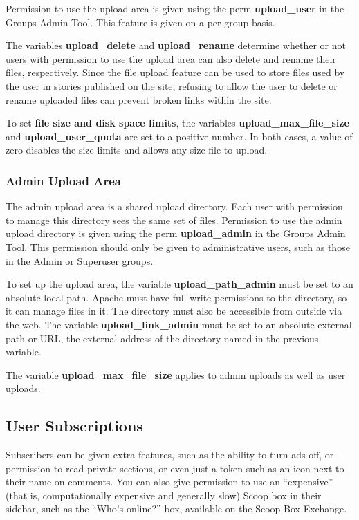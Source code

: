 Permission to use the upload area is given using the perm {\bf upload\_user} in the Groups Admin Tool. This feature is given on a per-group basis.

The variables {\bf upload\_delete} and {\bf upload\_rename} determine whether or not users with permission to use the upload area can also delete and rename their files, respectively. Since the file upload feature can be used to store files used by the user in stories published on the site, refusing to allow the user to delete or rename uploaded files can prevent broken links within the site.

To set {\bf file size and disk space limits}, the variables {\bf upload\_max\_file\_size} and {\bf upload\_user\_quota} are set to a positive number. In both cases, a value of zero disables the size limits and allows any size file to upload.

\subsubsection{Admin Upload Area}

The admin upload area is a shared upload directory. Each user with permission to manage this directory sees the same set of files. Permission to use the admin upload directory is given using the perm {\bf upload\_admin} in the Groups Admin Tool. This permission should only be given to administrative users, such as those in the Admin or Superuser groups.

To set up the upload area, the variable {\bf upload\_path\_admin} must be set to an absolute local path.  Apache must have full write permissions to the directory, so it can manage files in it. The directory must also be accessible from outside via the web. The variable {\bf upload\_link\_admin} must be set to an absolute external path or URL, the external address of the directory named in the previous variable.

The variable {\bf upload\_max\_file\_size} applies to admin uploads as well as user uploads.

\subsection{User Subscriptions}
\label{features-subscriptions}

Subscribers can be given extra features, such as the ability to turn ads off, or permission to read private sections, or even just a token such as an icon next to their name on comments.  You can also give permission to use an ``expensive'' (that is, computationally expensive and generally slow) Scoop box in their sidebar, such as the ``Who's online?'' box, available on the Scoop Box Exchange.


